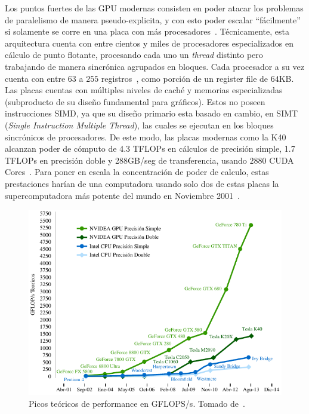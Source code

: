Los puntos fuertes de las GPU %
modernas consisten en poder atacar los problemas de paralelismo de manera pseudo-explicita, y con esto poder escalar ``f\'acilmente'' si solamente se corre en una placa con m\'as procesadores~\cite{cudaProgrammingGuide}.
T\'ecnicamente, esta arquitectura cuenta con entre cientos y miles de procesadores especializados en c\'alculo de punto flotante, procesando cada uno un \textit{thread} distinto pero
trabajando de manera sincr\'onica agrupados en bloques.
Cada procesador a su vez cuenta con entre $63$ a $255$ registros~\cite{NvidiaFermi,NvidiaKepler}, como porci\'on de un register file de $64$KB.
Las placas cuentas con m\'ultiples niveles de cach\'e y memorias especializadas (subproducto de su dise\~no fundamental para gr\'aficos).
Estos no poseen instrucciones SIMD, ya que su dise\~no primario esta basado en cambio, en SIMT (\textit{Single Instruction Multiple Thread}), las cuales se ejecutan en los bloques sincr\'onicos de procesadores.
De este modo, las placas modernas como la K40 alcanzan poder de c\'omputo de 4.3 TFLOPs en c\'alculos de precisi\'on simple, 1.7 TFLOPs en precisi\'on doble y 288GB/seg de
transferencia, usando $2880$ CUDA Cores~\cite{NvidiaKeplerDatasheet}.
Para poner en escala la concentraci\'on de poder de calculo, estas prestaciones har\'ian de una computadora usando solo dos de estas placas la supercomputadora m\'as potente del mundo en Noviembre 2001~\cite{Top500November2001}.

\begin{figure}[htbp]
    \centering
    \includegraphics[width=\plotwidth]{images/cuda-gflops_ES.pdf}
    \caption{Picos te\'oricos de performance en GFLOPS/s. Tomado de~\cite{cudaProgrammingGuide}.}
    \label{cuda-gflops}
\end{figure}

